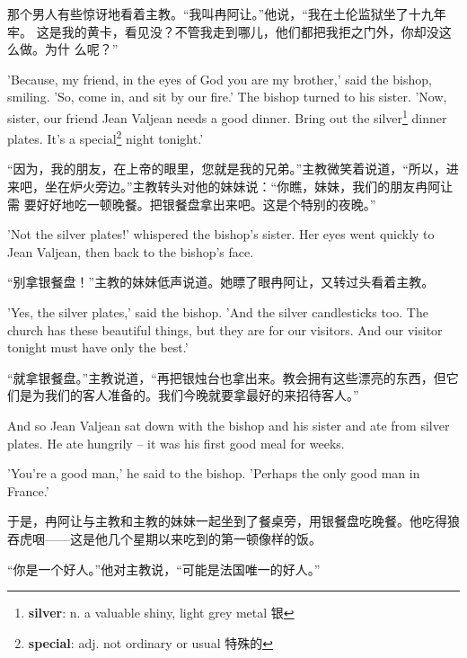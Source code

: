 \documentclass[fontset=ubuntu, zihao=5]{ctexart}
\begin{document}
\begin{paracol}{2}
  \switchcolumn

  那个男人有些惊讶地看着主教。“我叫冉阿让。”他说，“我在土伦监狱坐了十九年牢。
  这是我的黄卡，看见没？不管我走到哪儿，他们都把我拒之门外，你却没这么做。为什
  么呢？”

  \switchcolumn*

  'Because, my friend, in the eyes of God you are my brother,' said the
  bishop, smiling. 'So, come in, and sit by our fire.' The bishop turned to
  his sister. 'Now, sister, our friend Jean Valjean needs a good dinner. Bring
  out the silver\footnote{\textbf{silver}: n. a valuable shiny, light grey
    metal 银} dinner plates. It's a special\footnote{\textbf{special}: adj. not ordinary or usual 特殊的} night tonight.'

  \switchcolumn

  “因为，我的朋友，在上帝的眼里，您就是我的兄弟。”主教微笑着说道，“所以，进
  来吧，坐在炉火旁边。”主教转头对他的妹妹说：“你瞧，妹妹，我们的朋友冉阿让需
  要好好地吃一顿晚餐。把银餐盘拿出来吧。这是个特别的夜晚。”

  \switchcolumn*

  'Not the silver plates!' whispered the bishop's sister. Her eyes went quickly to Jean Valjean, then back to the bishop's face.

  \switchcolumn

  “别拿银餐盘！”主教的妹妹低声说道。她瞟了眼冉阿让，又转过头看着主教。

  \switchcolumn*

  'Yes, the silver plates,' said the bishop. 'And the silver candlesticks too. The church has these beautiful things, but they are for our visitors. And our visitor tonight must have only the best.'

  \switchcolumn
  “就拿银餐盘。”主教说道，“再把银烛台也拿出来。教会拥有这些漂亮的东西，但它们是为我们的客人准备的。我们今晚就要拿最好的来招待客人。”

  \switchcolumn*

  And so Jean Valjean sat down with the bishop and his sister and ate from silver plates. He ate hungrily – it was his first good meal for weeks.

  'You're a good man,' he said to the bishop. 'Perhaps the only good man in France.'

  \switchcolumn
  于是，冉阿让与主教和主教的妹妹一起坐到了餐桌旁，用银餐盘吃晚餐。他吃得狼吞虎咽——这是他几个星期以来吃到的第一顿像样的饭。

  “你是一个好人。”他对主教说，“可能是法国唯一的好人。”


\end{paracol}
\end{document}
